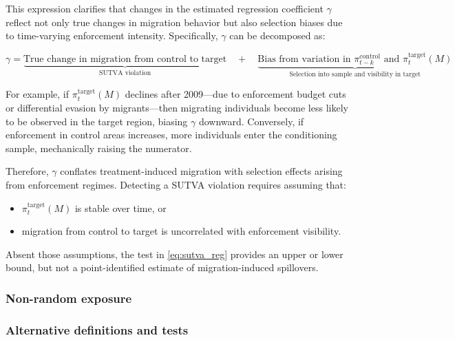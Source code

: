 \documentclass[12pt]{article}
\newcommand{\PTR}[1]{{\color{blue}{#1}}}
\begin{document}
\bigskip

\noindent This expression clarifies that changes in the estimated regression coefficient $\gamma$ reflect not only true changes in migration behavior but also selection biases due to time-varying enforcement intensity. Specifically, $\gamma$ can be decomposed as:

\begin{equation}
\boxed{
\gamma =
\underbrace{\text{True change in migration from control to target}}_{\text{SUTVA violation}}
\quad + \quad
\underbrace{\text{Bias from variation in } \pi^{\text{control}}_{t-k} \text{ and } \pi^{\text{target}}_t(M)}_{\text{Selection into sample and visibility in target}}
}
\end{equation}

\noindent For example, if $\pi^{\text{target}}_t(M)$ declines after 2009—due to enforcement budget cuts or differential evasion by migrants—then migrating individuals become less likely to be observed in the target region, biasing $\gamma$ downward. Conversely, if enforcement in control areas increases, more individuals enter the conditioning sample, mechanically raising the numerator.

\bigskip

\noindent Therefore, $\gamma$ conflates treatment-induced migration with selection effects arising from enforcement regimes. Detecting a SUTVA violation requires assuming that:

\begin{itemize}
  \item $\pi^{\text{target}}_t(M)$ is stable over time, or
  \item migration from control to target is uncorrelated with enforcement visibility.
\end{itemize}

\noindent Absent those assumptions, the test in \eqref{eq:sutva_reg} provides an upper or lower bound, but not a point-identified estimate of migration-induced spillovers.
\fi

\subsubsection{Non-random exposure}

\PTR{Two paragraphs with a robustness to rule out bias introduced by non-random exposure.}

\subsubsection{Alternative definitions and tests} \label{sec:9}
\end{document}
